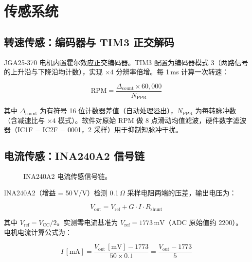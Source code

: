\documentclass[12pt, a4paper]{ctexrep}
\begin{document}
\section{传感系统}

\subsection{转速传感：编码器与 TIM3 正交解码}

JGA25-370 电机内置霍尔效应正交编码器。TIM3 配置为编码器模式 3（两路信号的上升沿与下降沿均计数），实现 $\times4$ 分辨率倍增。每 1\,ms 计算一次转速：

\begin{equation}
    \text{RPM} = \frac{\Delta_{\text{count}} \times 60{,}000}
                      {N_{\text{PPR}}}
    \label{eq:rpm}
\end{equation}

其中 $\Delta_{\text{count}}$ 为有符号 16 位计数器差值（自动处理溢出），$N_{\text{PPR}}$ 为每转脉冲数（含减速比与 $\times4$ 模式）。软件对原始 RPM 做 8 点滑动均值滤波，硬件数字滤波器（IC1F = IC2F = 0001，2 采样）用于抑制短脉冲干扰。

\subsection{电流传感：INA240A2 信号链}

\begin{figure}[H]
    \centering
    \caption{INA240A2 电流传感信号链。}
    \label{fig:ina240}
\end{figure}

INA240A2（增益 = 50\,V/V）检测 0.1\,$\Omega$ 采样电阻两端的压差，输出电压为：

\begin{equation}
    V_{\text{out}} = V_{\text{ref}} + G \cdot I \cdot R_{\text{shunt}}
    \label{eq:ina240_out}
\end{equation}

其中 $V_{\text{ref}} = V_{\text{CC}}/2$。实测零电流基准为 $V_{\text{ref}} = 1773\,\text{mV}$（ADC 原始值约 2200）。电机电流计算公式为：

\begin{equation}
    I\,[\text{mA}] = \frac{V_{\text{out}}\,[\text{mV}] - 1773}
                         {50 \times 0.1}
                  = \frac{V_{\text{out}} - 1773}{5}
    \label{eq:current}
\end{equation}
\end{document}
